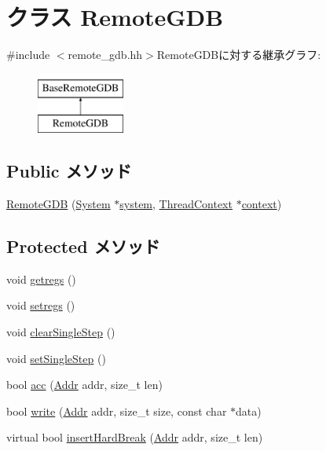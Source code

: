 \hypertarget{classAlphaISA_1_1RemoteGDB}{
\section{クラス RemoteGDB}
\label{classAlphaISA_1_1RemoteGDB}
}


{\ttfamily \#include $<$remote\_\-gdb.hh$>$}RemoteGDBに対する継承グラフ:\begin{figure}[H]
\begin{center}
\leavevmode
\includegraphics[height=2cm]{classAlphaISA_1_1RemoteGDB}
\end{center}
\end{figure}
\subsection*{Public メソッド}
\begin{DoxyCompactItemize}
\item 
\hyperlink{classAlphaISA_1_1RemoteGDB_a7d97c5a4edd8630299b2b0521ae32d98}{RemoteGDB} (\hyperlink{classSystem}{System} $\ast$\hyperlink{classBaseRemoteGDB_af27ccd765f13a4b7bd119dc7579e2746}{system}, \hyperlink{classThreadContext}{ThreadContext} $\ast$\hyperlink{classBaseRemoteGDB_a9684dd9218c7836517670f8a0d8f3df7}{context})
\end{DoxyCompactItemize}
\subsection*{Protected メソッド}
\begin{DoxyCompactItemize}
\item 
void \hyperlink{classAlphaISA_1_1RemoteGDB_a62bc8adc5a48f1cbb5eb9bb64301d38d}{getregs} ()
\item 
void \hyperlink{classAlphaISA_1_1RemoteGDB_a2051121b6bc93c8ca3856bbeeca7bdc1}{setregs} ()
\item 
void \hyperlink{classAlphaISA_1_1RemoteGDB_afd89268069d9026378b06b08c97f65f8}{clearSingleStep} ()
\item 
void \hyperlink{classAlphaISA_1_1RemoteGDB_a40d5da340fdb741de8cd3ffbc69708fe}{setSingleStep} ()
\item 
bool \hyperlink{classAlphaISA_1_1RemoteGDB_ac4c7be164f087f2f53d137d9768809a7}{acc} (\hyperlink{classm5_1_1params_1_1Addr}{Addr} addr, size\_\-t len)
\item 
bool \hyperlink{classAlphaISA_1_1RemoteGDB_afbada55bb9d0e9c8c26bb48cb5890111}{write} (\hyperlink{classm5_1_1params_1_1Addr}{Addr} addr, size\_\-t size, const char $\ast$data)
\item 
virtual bool \hyperlink{classAlphaISA_1_1RemoteGDB_a6a65f23f1e316fc2362cced431fa2335}{insertHardBreak} (\hyperlink{classm5_1_1params_1_1Addr}{Addr} addr, size\_\-t len)
\end{DoxyCompactItemize}
